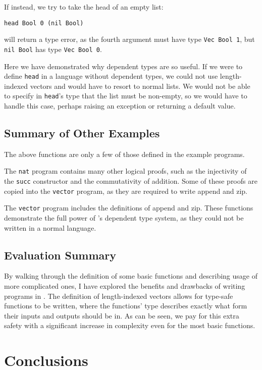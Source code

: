 \documentclass[12pt,a4paper,twoside]{report}
\begin{document}
If instead, we try to take the head of an empty list:
\begin{lstlisting}[gobble=4]
    head Bool 0 (nil Bool)
\end{lstlisting}
\pimu{} will return a type error, as the fourth argument must have type \lstinline{Vec Bool 1}, but \lstinline{nil Bool} has type \lstinline{Vec Bool 0}.

Here we have demonstrated why dependent types are so useful.
If we were to define \lstinline{head} in a language without dependent types, we could not use length-indexed vectors and would have to resort to normal lists.
We would not be able to specify in \lstinline{head}'s type that the list must be non-empty, so we would have to handle this case, perhaps raising an exception or returning a default value.

\section{Summary of Other Examples}

The above functions are only a few of those defined in the example programs.

The \texttt{nat} program contains many other logical proofs, such as the injectivity of the \lstinline{succ} constructor and the commutativity of addition.
Some of these proofs are copied into the \texttt{vector} program, as they are required to write append and zip.

The \texttt{vector} program includes the definitions of append and zip.
These functions demonstrate the full power of \pimu{}'s dependent type system, as they could not be written in a normal language.

\section{Evaluation Summary}

By walking through the definition of some basic functions and describing usage of more complicated ones, I have explored the benefits and drawbacks of writing programs in \pimu{}.
The definition of length-indexed vectors allows for type-safe functions to be written, where the functions' type describes exactly what form their inputs and outputs should be in.
As can be seen, we pay for this extra safety with a significant increase in complexity even for the most basic functions.

\chapter{Conclusions}
\end{document}
